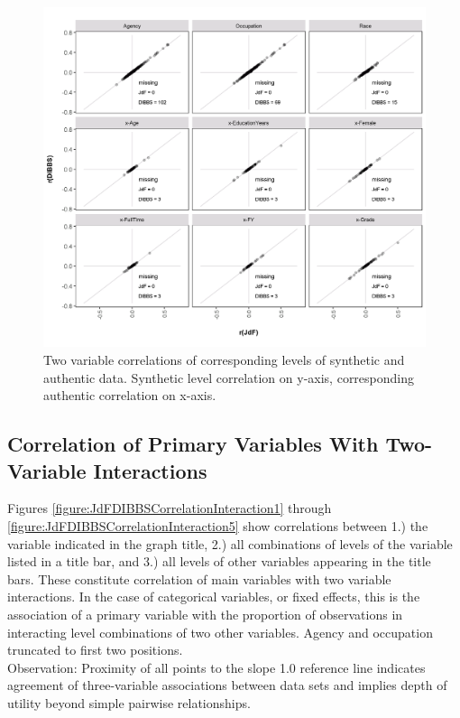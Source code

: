 \documentclass[10pt, letterpaper]{article}
\begin{document}
\begin{spacing}{1.0}
\begin{figure}[h]
    \includegraphics[width=5in]{JdFDIBBSCorrelation.png}
    \centering
    \caption{Two variable correlations of corresponding levels of synthetic and authentic data.  Synthetic level correlation on y-axis, corresponding authentic correlation on x-axis.}
    \label{figure:JdFDIBBSCorrelation}
\end{figure}  

\clearpage

\subsection{Correlation of Primary Variables With Two-Variable Interactions}

Figures \ref{figure:JdFDIBBSCorrelationInteraction1} through \ref{figure:JdFDIBBSCorrelationInteraction5} show correlations between 1.) the variable indicated in the graph title, 2.) all combinations of levels of the variable listed in a title bar, and 3.) all levels of other variables appearing in the title bars.  These constitute correlation of main variables with two variable interactions.  In the case of categorical variables, or fixed effects, this is the association of a primary variable with the proportion of observations in interacting level combinations of two other variables.  Agency and occupation truncated to first two positions.\\

Observation:  Proximity of all points to the slope 1.0 reference line indicates agreement of three-variable associations between data sets and implies depth of utility beyond simple pairwise relationships.\\


\end{spacing}
\end{document}
